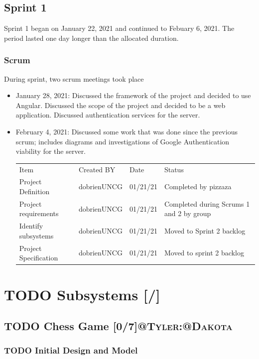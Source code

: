 \documentclass[11pt]{article}
\begin{document}
\subsection{Sprint 1}
\label{sec:org3c75951}
Sprint 1 began on January 22, 2021 and continued to Febuary
6, 2021. The period lasted one day longer than the allocated duration.
\subsubsection{Scrum}
\label{sec:orga4ea07f}
During sprint, two scrum meetings took place
\begin{itemize}
\item January 28, 2021: Discussed the framework of the project and
decided to use Angular. Discussed the scope of the project and
decided to be a web application. Discussed authentication
services for the server.
\item February 4, 2021: Discussed some work that was done since the
previous scrum; includes diagrams and investigations of Google
Authentication viability for the server.

\begin{center}
\begin{tabular}{llll}
Item & Created BY & Date & Status\\
Project Definition & dobrienUNCG & 01/21/21 & Completed by pizzaza\\
Project requirements & dobrienUNCG & 01/21/21 & Completed during Scrums 1 and 2 by group\\
Identify subsystems & dobrienUNCG & 01/21/21 & Moved to Sprint 2 backlog\\
Project Specification & dobrienUNCG & 01/21/21 & Moved to sprint 2 backlog\\
\end{tabular}
\end{center}
\end{itemize}

\section{{\bfseries\sffamily TODO} Subsystems [/]}
\label{sec:orgab00ee7}
\subsection{{\bfseries\sffamily TODO} Chess Game [0/7]\hfill{}\textsc{@Tyler:@Dakota}}
\label{sec:orgcfe3af6}
\subsubsection{{\bfseries\sffamily TODO} Initial Design and Model}
\label{sec:org3c12605}
\end{document}
